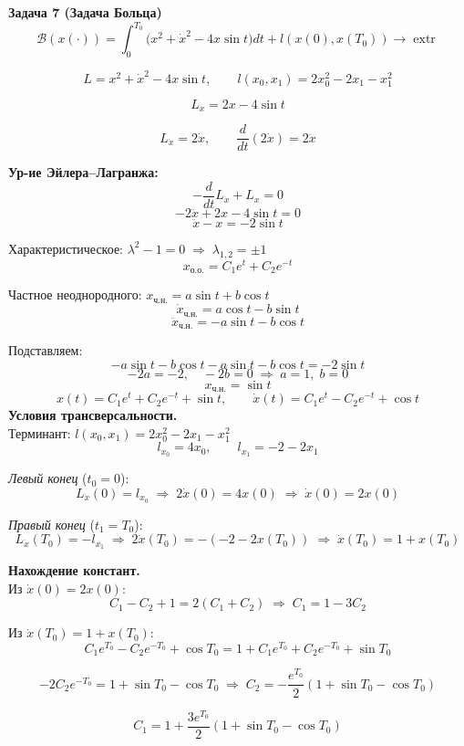 \documentclass[12pt,a4paper,fleqn]{article}
\begin{document}
\noindent\textbf{\Large Задача 7 (Задача Больца)}\\[0.4cm]

\[
\mathcal{B}(x(\cdot))=\int_0^{T_0}\!\bigl(x^2+\dot x^2-4x\sin t\bigr)dt + l(x(0),x(T_0))\to\operatorname{extr}
\]

\[
L = x^2+\dot x^2-4x\sin t, \qquad l(x_0,x_1)=2x_0^2-2x_1-x_1^2
\]

\[
L_x = 2x-4\sin t
\]

\[
L_{\dot x} = 2\dot x,\qquad \frac{d}{dt}(2\dot x)=2\ddot x
\]

\bigskip
\textbf{Ур-ие Эйлера–Лагранжа:}
\[
-\frac{d}{dt}L_{\dot x}+L_x=0
\]
\[
-2\ddot x+2x-4\sin t=0
\]
\[
\ddot x-x=-2\sin t
\]

Характеристическое: $\lambda^2-1=0\;\Rightarrow\;\lambda_{1,2}=\pm 1$
\[
x_{\text{о.о.}}=C_1 e^t+C_2 e^{-t}
\]

Частное неоднородного: $x_{\text{ч.н.}}=a\sin t+b\cos t$
\[
\dot x_{\text{ч.н.}}=a\cos t-b\sin t
\]
\[
\ddot x_{\text{ч.н.}}=-a\sin t-b\cos t
\]

Подставляем:
\[
-a\sin t-b\cos t-a\sin t-b\cos t=-2\sin t
\]
\[
-2a=-2,\quad -2b=0\;\Rightarrow\;a=1,\;b=0
\]
\[
x_{\text{ч.н.}}=\sin t
\]
\[
x(t)=C_1 e^t+C_2 e^{-t}+\sin t,\qquad \dot x(t)=C_1 e^t-C_2 e^{-t}+\cos t
\]
\newpage
\bigskip
\textbf{Условия трансверсальности.}\\
\vspace{0.5 cm}
Терминант: $l(x_0,x_1)=2x_0^2-2x_1-x_1^2$\\
\vspace{0.5 cm}
\[
l_{x_0}=4x_0,\qquad l_{x_1}=-2-2x_1
\]

\textit{Левый конец} ($t_0=0$):
\[
L_{\dot x}(0)=l_{x_0}\;\Rightarrow\;2\dot x(0)=4x(0)\;\Rightarrow\;\dot x(0)=2x(0)
\]

\textit{Правый конец} ($t_1=T_0$):
\[
L_{\dot x}(T_0)=-l_{x_1}\;\Rightarrow\;2\dot x(T_0)=-(-2-2x(T_0))\;\Rightarrow\;\dot x(T_0)=1+x(T_0)
\]

\bigskip
\textbf{Нахождение констант.}\\
\vspace{0.5 cm}
Из $\dot x(0)=2x(0)$:
\[
C_1-C_2+1=2(C_1+C_2)\;\Rightarrow\;C_1=1-3C_2
\]

Из $\dot x(T_0)=1+x(T_0)$:
\[
C_1 e^{T_0}-C_2 e^{-T_0}+\cos T_0=1+C_1 e^{T_0}+C_2 e^{-T_0}+\sin T_0
\]

\[
-2C_2 e^{-T_0}=1+\sin T_0-\cos T_0\;\Rightarrow\;C_2=-\frac{e^{T_0}}{2}(1+\sin T_0-\cos T_0)
\]

\[
C_1=1+\frac{3e^{T_0}}{2}(1+\sin T_0-\cos T_0)
\]
\end{document}
